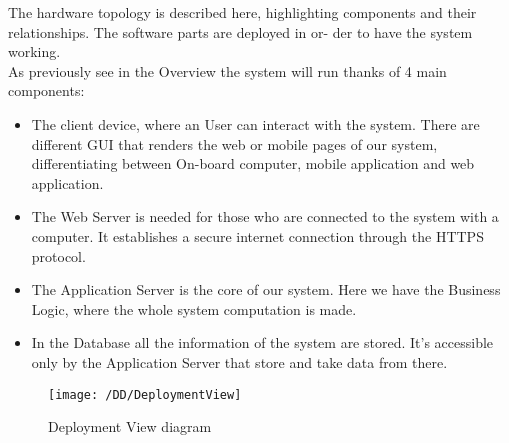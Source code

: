The hardware topology is described here, highlighting components and their relationships. The software parts are deployed in or-
der to have the system working.
\\As previously see in the Overview the system will run thanks of 4 main components:
\begin{itemize}
	\item{The client device, where an User can interact with the system. There are different GUI that renders the web or mobile pages of our system, differentiating between On-board computer, mobile application and web application.}
	\item{ The Web Server is needed for those who are connected to the system with a computer. It establishes a secure internet connection through the HTTPS protocol.}
	\item{The Application Server is the core of our system. Here we have the Business Logic, where the whole system computation is
made.}
	\item{In the Database all the information of the system are stored. It's accessible only by the Application Server that store and take data from there.}
\end{itemize} 

\begin{figure}[!ht]
  \centering
  \vspace{0.2cm}
  \texttt{[image: /DD/DeploymentView]}\\
  \vspace{0.4cm}
  \caption{Deployment View diagram} 
  \label{fig:DeploymentView} 
\end{figure}
